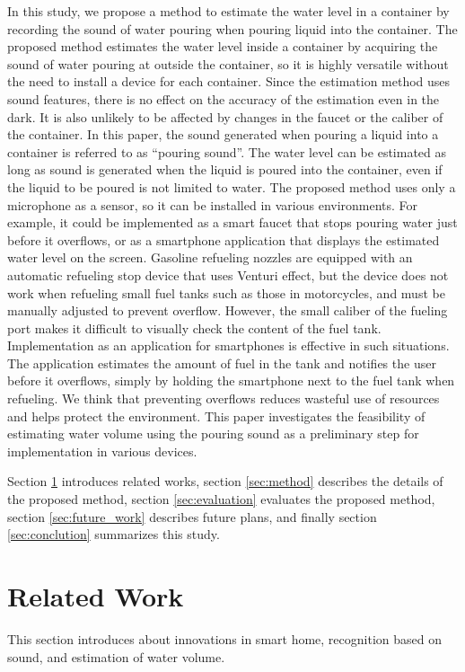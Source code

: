 \documentclass[sigconf]{acmart}
\begin{document}
In this study, we propose a method to estimate the water level in a container by recording the sound of water pouring when pouring liquid into the container. The proposed method estimates the water level inside a container by acquiring the sound of water pouring at outside the container, so it is highly versatile without the need to install a device for each container. Since the estimation method uses sound features, there is no effect on the accuracy of the estimation even in the dark. It is also unlikely to be affected by changes in the faucet or the caliber of the container. In this paper, the sound generated when pouring a liquid into a container is referred to as ``pouring sound''. The water level can be estimated as long as sound is generated when the liquid is poured into the container, even if the liquid to be poured is not limited to water. The proposed method uses only a microphone as a sensor, so it can be installed in various environments. For example, it could be implemented as a smart faucet that stops pouring water just before it overflows, or as a smartphone application that displays the estimated water level on the screen. Gasoline refueling nozzles are equipped with an automatic refueling stop device that uses Venturi effect, but the device does not work when refueling small fuel tanks such as those in motorcycles, and must be manually adjusted to prevent overflow. However, the small caliber of the fueling port makes it difficult to visually check the content of the fuel tank. Implementation as an application for smartphones is effective in such situations. The application estimates the amount of fuel in the tank and notifies the user before it overflows, simply by holding the smartphone next to the fuel tank when refueling. We think that preventing overflows reduces wasteful use of resources and helps protect the environment. This paper investigates the feasibility of estimating water volume using the pouring sound as a preliminary step for implementation in various devices.\par

Section \ref{sec:related} introduces related works, section \ref{sec:method} describes the details of the proposed method, section \ref{sec:evaluation} evaluates the proposed method, section \ref{sec:future_work} describes future plans, and finally section \ref{sec:conclution} summarizes this study.



\section{Related Work}
\label{sec:related}
This section introduces about innovations in smart home, recognition based on sound, and estimation of water volume.
\end{document}
